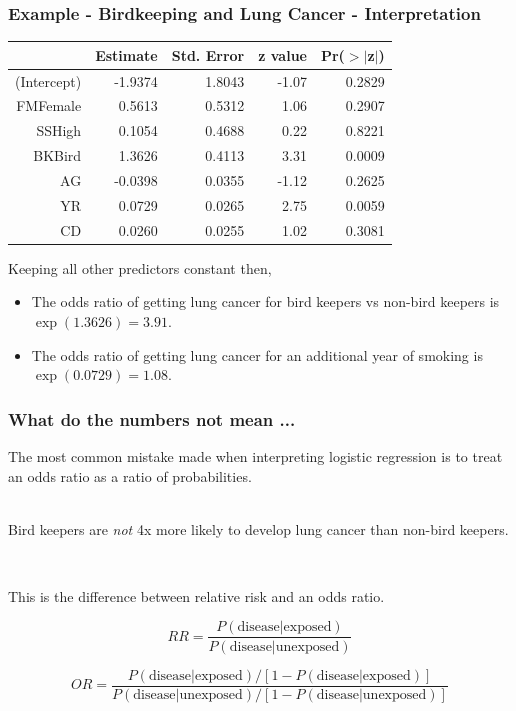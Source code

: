
\begin{frame}
\frametitle{Example - Birdkeeping and Lung Cancer - Interpretation}

\vspace{-5mm}

{\scriptsize
\begin{center}
\begin{tabular}{rrrrr}
  \hline
 & Estimate & Std. Error & z value & Pr($>$$|$z$|$) \\ 
  \hline
(Intercept) & -1.9374 & 1.8043 & -1.07 & 0.2829 \\ 
  FMFemale  & 0.5613 & 0.5312 & 1.06 & 0.2907 \\ 
  SSHigh    & 0.1054 & 0.4688 & 0.22 & 0.8221 \\
\rowcolor{gray}
  BKBird    & 1.3626 & 0.4113 & 3.31 & 0.0009 \\ 
  AG        & -0.0398 & 0.0355 & -1.12 & 0.2625 \\ 
\rowcolor{gray}
  YR        & 0.0729 & 0.0265 & 2.75 & 0.0059 \\ 
  CD        & 0.0260 & 0.0255 & 1.02 & 0.3081 \\ 
   \hline
\end{tabular}
\end{center}
}

\pause

Keeping all other predictors constant then,
\begin{itemize}
\pause
\item The odds ratio of getting lung cancer for bird keepers vs non-bird keepers is $\exp(1.3626) = 3.91$.
\pause
\item The odds ratio of getting lung cancer for an additional year of smoking is $\exp(0.0729) = 1.08$.
\end{itemize}

\end{frame}


\begin{frame}
\frametitle{What do the numbers not mean ...}

The most common mistake made when interpreting logistic regression is to treat an odds ratio as a ratio of probabilities.\\

~\\ \pause

Bird keepers are \emph{not} 4x more likely to develop lung cancer than non-bird keepers.

~\\ \pause

This is the difference between relative risk and an odds ratio.


\[RR = \frac{P(\text{disease} | \text{exposed})}{P(\text{disease} | \text{unexposed})} \]

\[OR = \frac{P(\text{disease} | \text{exposed}) / [1-P(\text{disease} | \text{exposed})]}{P(\text{disease} | \text{unexposed})/[1-P(\text{disease} | \text{unexposed})]} \]


\end{frame}

